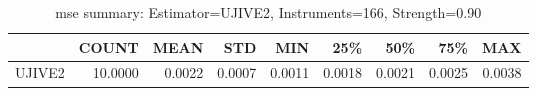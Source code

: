 \begin{table}[ht]
\centering
\caption{mse summary: Estimator=UJIVE2, Instruments=166, Strength=0.90}
\begin{tabular}{lrrrrrrrr}
\toprule
 & COUNT & MEAN & STD & MIN & 25\% & 50\% & 75\% & MAX \\
\midrule
UJIVE2 & 10.0000 & 0.0022 & 0.0007 & 0.0011 & 0.0018 & 0.0021 & 0.0025 & 0.0038 \\
\bottomrule
\end{tabular}
\end{table}
